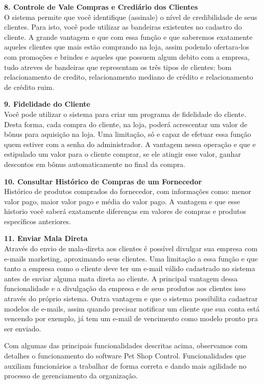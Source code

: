 \documentclass[12pt,openright,twoside,a4paper,english,french,spanish,brazil]{abntex2}
\begin{document}
\textbf{8.	Controle de Vale Compras e Crediário dos Clientes}\\
O sistema permite que você identifique (assinale) o nível de credibilidade de seus clientes. Para isto, você pode utilizar as bandeiras existentes no cadastro do cliente. A grande vantagem e que com essa função e que saberemos exatamente aqueles clientes que mais estão comprando na loja, assim podendo ofertara-los com promoções e brindes e aqueles que possuem algum debito com a empresa, tudo atreves de bandeiras que representam os três tipos de clientes: bom relacionamento de credito, relacionamento mediano de crédito e relacionamento de crédito ruim.

\textbf{9.	Fidelidade do Cliente}\\
Você pode utilizar o sistema para criar um programa de fidelidade do cliente. Desta forma, cada compra do cliente, na loja, poderá acrescentar um valor de bônus para aquisição na loja. Uma limitação, só e capaz de efetuar essa função quem estiver com a senha do administrador. A vantagem nessa operação e que e estipulado um valor para o cliente comprar, se ele atingir esse valor, ganhar descontos em bônus automaticamente no final da compra.

\textbf{10.	Consultar Histórico de Compras de um Fornecedor}\\
Histórico de produtos comprados do fornecedor, com informações como: menor valor pago, maior valor pago e média do valor pago. A vantagem e que esse historio você saberá exatamente diferenças em valores de compras e produtos específicos anteriores.

\textbf{11.	Enviar Mala Direta}\\
Através do envio de mala-direta aos clientes é possível divulgar sua empresa com e-mails marketing, aproximando seus clientes. Uma limitação a essa função e que tanto a empresa como o cliente deve ter um e-mail válido cadastrado no sistema antes de enviar alguma mata direta ao cliente. A principal vantagem dessa funcionalidade e a divulgação da empresa e de seus produtos aos clientes isso através do próprio sistema. Outra vantagem e que o sistema possibilita cadastrar modelos de e-mails, assim quando precisar notificar um cliente que sua conta está vencendo por exemplo, já tem um e-mail de vencimento como modelo pronto pra ser enviado.
 

Com algumas das principais funcionalidades descritas acima, observamos com detalhes o funcionamento do software Pet Shop Control. Funcionalidades que auxiliam funcionários a trabalhar de forma correta e dando mais agilidade no processo de gerenciamento da organização.
\end{document}
